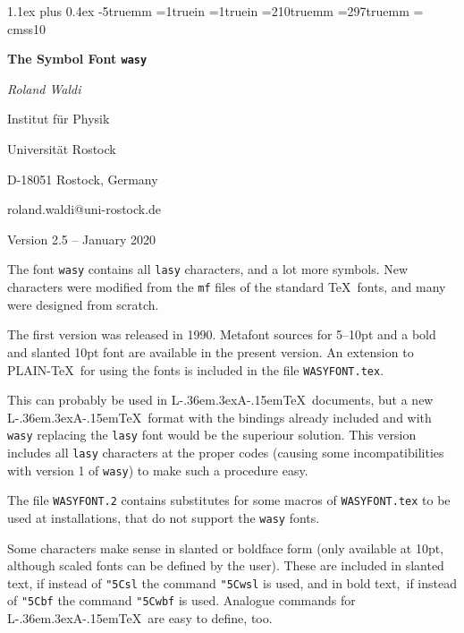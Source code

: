 \magnification{}
\parskip 1.1ex plus 0.4ex
\advance\hsize -5truemm
\ifx\pdfoutput\undefines\else
 \pdfhorigin=1truein
 \pdfvorigin=1truein
 \pdfpagewidth=210truemm
 \pdfpageheight=297truemm
\fi
\parindent 0pt
%
\font\tenssf = cmss10    %
\def\ssf{\tenssf}
\def\\{\char"5C{}}       %
\def\({\char`\{}         %
\def\){\char`\}}         %
\def\newline{\hfill\break}
\def\de{\,{\rm d}}
\def\LaTeX{{\rm L\kern-.36em\raise.3ex\hbox{\sevenrm A}\kern-.15em\TeX}}
%

%

\centerline{\bf The Symbol Font \tt wasy}
\parskip
\centerline{\it Roland Waldi}
\vskip 1mm
\centerline{Institut f\"ur Physik}
\centerline{Universit\"at Rostock}
\centerline{D-18051 Rostock, Germany}
\centerline{roland.waldi@uni-rostock.de}
\vskip 1mm
\centerline{Version 2.5 -- January 2020}

\parskip

The font {\tt wasy} contains all {\tt lasy} characters, and
a lot more symbols.
New characters
were modified from the {\tt mf} files of the standard \TeX\ fonts,
and many were designed from scratch.

The first version was released in 1990.
Metafont sources for 5--10pt and a bold and slanted 10pt font
are available in the present version.
An extension to PLAIN-\TeX\ for using the fonts is included
in the file {\tt WASYFONT.tex}.

This can probably be used in \LaTeX\ documents,
but a new \LaTeX\ format with the bindings already included and with
{\tt wasy} replacing the {\tt lasy} font would be the superiour
solution.
This version includes all {\tt lasy} characters at the proper codes
(causing some incompatibilities with version 1 of {\tt wasy})
to make such a procedure easy.

The file {\tt WASYFONT.2} contains substitutes for some macros
of {\tt WASYFONT.tex} to be used
at installations, that do not
support the {\tt wasy} fonts.

Some characters make sense in slanted or boldface form (only available at 10pt,
although scaled fonts can be defined by the user).
These are included in slanted text, if instead of {\tt\\sl}
the command {\tt\\wsl} is used, and in bold text,\
if instead of {\tt\\bf}
the command {\tt\\wbf} is used. Analogue commands for
\LaTeX\ are easy to define, too.

